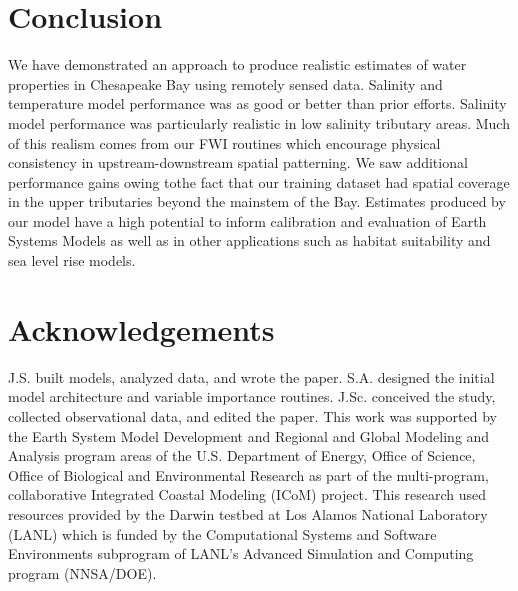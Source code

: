 \documentclass{article}
\begin{document}
\section{Conclusion}

We have demonstrated an approach to produce realistic estimates of water properties in Chesapeake Bay using remotely sensed data. Salinity and temperature model performance was as good or better than prior efforts. Salinity model performance was particularly realistic in low salinity tributary areas. Much of this realism comes from our FWI routines which encourage physical consistency in upstream-downstream spatial patterning. We saw additional performance gains owing tothe fact that our training dataset had spatial coverage in the upper tributaries beyond the mainstem of the Bay. Estimates produced by our model have a high potential to inform calibration and evaluation of Earth Systems Models as well as in other applications such as habitat suitability and sea level rise models.

\FloatBarrier

\section{Acknowledgements}

J.S. built models, analyzed data, and wrote the paper. S.A. designed the initial model architecture and variable importance routines. J.Sc. conceived the study, collected observational data, and edited the paper. This work was supported by the Earth System Model Development and Regional and Global Modeling and Analysis program areas of the U.S. Department of Energy, Office of Science, Office of Biological and Environmental Research as part of the multi-program, collaborative Integrated Coastal Modeling (ICoM) project. This research used resources provided by the Darwin testbed at Los Alamos National Laboratory (LANL) which is funded by the Computational Systems and Software Environments subprogram of LANL's Advanced Simulation and Computing program (NNSA/DOE).



\end{document}
